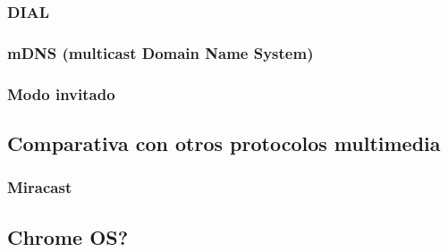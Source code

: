 \subsubsection{DIAL}


\subsubsection{mDNS (multicast Domain Name System)}


\subsubsection{Modo invitado}


\subsection{Comparativa con otros protocolos multimedia}

\subsubsection{Miracast}


\subsection{Chrome OS?}
